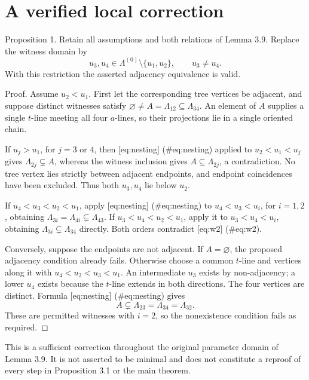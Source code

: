 \documentclass[10pt]{article}
\begin{document}
\section*{A verified local correction}
Proposition 1.  Retain all assumptions and both relations of Lemma 3.9. Replace the witness domain by \[u_3,u_4\in\Lambda^{(0)}\setminus\{u_1,u_2\},
 \qquad u_3\ne u_4.\] With this restriction the asserted adjacency equivalence is valid.\par
Proof. Assume \(u_2<u_1\). First let the corresponding tree vertices be adjacent, and suppose distinct witnesses satisfy \(\varnothing\ne A=\Lambda_{12}\subseteq\Lambda_{34}\). An element of \(A\) supplies a single \(t\)-line meeting all four \(a\)-lines, so their projections lie in a single oriented chain.\par
If \(u_j>u_1\), for \(j=3\) or \(4\), then [eq:nesting] (\#eq:nesting) applied to \(u_2<u_1<u_j\) gives \(\Lambda_{2j}\subsetneq A\), whereas the witness inclusion gives \(A\subseteq\Lambda_{2j}\), a contradiction. No tree vertex lies strictly between adjacent endpoints, and endpoint coincidences have been excluded. Thus both \(u_3,u_4\) lie below \(u_2\).\par
If \(u_4<u_3<u_2<u_1\), apply [eq:nesting] (\#eq:nesting) to \(u_4<u_3<u_i\), for \(i=1,2\), obtaining \(\Lambda_{3i}=\Lambda_{4i}\subsetneq\Lambda_{43}\). If \(u_3<u_4<u_2<u_1\), apply it to \(u_3<u_4<u_i\), obtaining \(\Lambda_{3i}\subsetneq\Lambda_{34}\) directly. Both orders contradict [eq:w2] (\#eq:w2).\par
Conversely, suppose the endpoints are not adjacent. If \(A=\varnothing\), the proposed adjacency condition already fails. Otherwise choose a common \(t\)-line and vertices along it with \(u_4<u_2<u_3<u_1\). An intermediate \(u_3\) exists by non-adjacency; a lower \(u_4\) exists because the \(t\)-line extends in both directions. The four vertices are distinct. Formula [eq:nesting] (\#eq:nesting) gives \[A\subsetneq\Lambda_{23}=\Lambda_{34}=\Lambda_{32}.\] These are permitted witnesses with \(i=2\), so the nonexistence condition fails as required. ◻\par
This is a sufficient correction throughout the original parameter domain of Lemma 3.9. It is not asserted to be minimal and does not constitute a reproof of every step in Proposition 3.1 or the main theorem.\par
\end{document}
